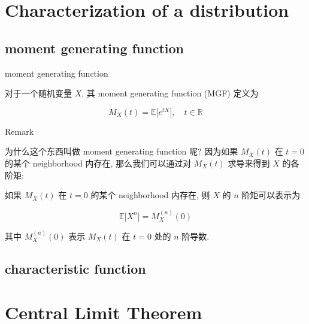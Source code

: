 \documentclass{qlnotes-export}
\begin{document}
\section{Characterization of a distribution}\label{characterization-of-a-distribution}

\subsection{moment generating function}\label{moment-generating-function}

\begin{definition}{moment generating function}\label{def-05-clt-moment-generating-function}

对于一个随机变量 \(X\), 其 moment generating function (MGF) 定义为

\[M_{X}(t) = {\mathbb{E}}\lbrack e^{tX}\rbrack,\quad t \in {\mathbb{R}}\]

\end{definition}

\begin{qlremark}{Remark}

为什么这个东西叫做 moment generating function 呢? 因为如果 \(M_{X}(t)\) 在 \(t = 0\) 的某个 neighborhood 内存在, 那么我们可以通过对 \(M_{X}(t)\) 求导来得到 \(X\) 的各阶矩:

\end{qlremark}

\begin{proposition}\label{prop-05-clt-proposition-001}

如果 \(M_{X}(t)\) 在 \(t = 0\) 的某个 neighborhood 内存在, 则 \(X\) 的 \(n\) 阶矩可以表示为

\[{\mathbb{E}}\lbrack X^{n}\rbrack = M_{X}^{(n)}(0)\]

其中 \(M_{X}^{(n)}(0)\) 表示 \(M_{X}(t)\) 在 \(t = 0\) 处的 \(n\) 阶导数.

\end{proposition}

\subsection{characteristic function}\label{characteristic-function}

\section{Central Limit Theorem}\label{central-limit-theorem-1}
\end{document}
